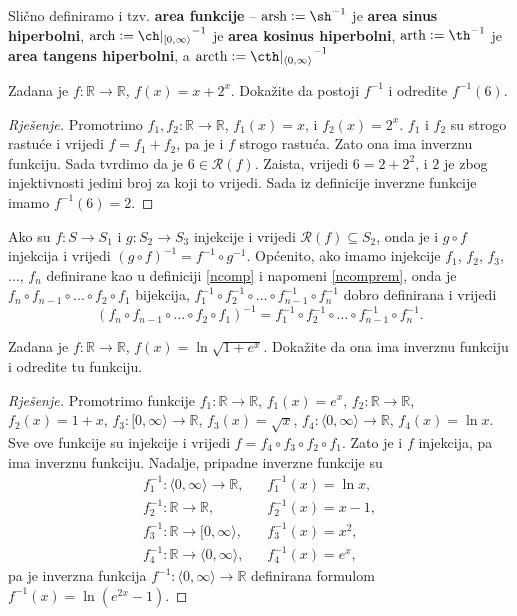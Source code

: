 Slično definiramo i tzv. \textbf{area funkcije} -- $\mathrm{arsh}:=\sh^{-1}$ je \textbf{area sinus hiperbolni}, $\mathrm{arch}:={\ch|_{[0, \infty\rangle}}^{-1}$ je \textbf{area kosinus hiperbolni}, $\mathrm{arth}:=\th^{-1}$ je \textbf{area tangens hiperbolni}, a $\mathrm{arcth}:={\cth|_{\langle 0, \infty\rangle}}^{-1}$
\newpage
\begin{exercise}
Zadana je $f : \mathbb{R}\to \mathbb{R}$, $f(x)=x+2^x$. Dokažite da postoji $f^{-1}$ i odredite $f^{-1}(6)$.
\end{exercise}
\begin{proof}[Rješenje]
Promotrimo $f_1, f_2 : \mathbb{R}\to \mathbb{R}$, $f_1(x)=x$, i $f_2(x)=2^x$. $f_1$ i $f_2$ su strogo rastuće i vrijedi $f=f_1+f_2$, pa je i $f$ strogo rastuća. Zato ona ima inverznu funkciju. Sada tvrdimo da je $6\in \mathcal{R}(f)$. Zaista, vrijedi $6=2+2^2$, i $2$ je zbog injektivnosti jedini broj za koji to vrijedi. Sada iz definicije inverzne funkcije imamo $f^{-1}(6)=2$.
\end{proof}
\begin{remark}
Ako su $f : S\to S_1$ i $g : S_2 \to S_3$ injekcije i vrijedi $\mathcal{R}(f)\subseteq S_2$, onda je i $g\circ f$ injekcija i vrijedi $(g\circ f)^{-1}=f^{-1}\circ g^{-1}$. Općenito, ako imamo injekcije $f_1$, $f_2$, $f_3$, $\dots$, $f_n$ definirane kao u definiciji \ref{ncomp} i napomeni \ref{ncomprem}, onda je $f_n\circ f_{n-1}\circ\dots\circ f_2\circ f_1$ bijekcija, $f_1^{-1}\circ f_2^{-1}\circ \dots \circ f_{n-1}^{-1}\circ f_n^{-1}$ dobro definirana i vrijedi
$$(f_n\circ f_{n-1}\circ\dots\circ f_2\circ f_1)^{-1}=f_1^{-1}\circ f_2^{-1}\circ \dots \circ f_{n-1}^{-1}\circ f_n^{-1}.$$
\end{remark}
\begin{exercise}
Zadana je $f : \mathbb{R}\to \mathbb{R}$, $f(x)=\ln{\sqrt{1+e^x}}$. Dokažite da ona ima inverznu funkciju i odredite tu funkciju.
\end{exercise}
\begin{proof}[Rješenje]
Promotrimo funkcije $f_1: \mathbb{R}\to \mathbb{R}$, $f_1(x)=e^x$, $f_2 : \mathbb{R}\to \mathbb{R}$, $f_2(x)=1+x$, $f_3 : [ 0,\infty\rangle\to \mathbb{R}$, $f_3(x)=\sqrt{x}$, $f_4 : \langle 0,\infty\rangle\to \mathbb{R}$, $f_4(x)=\ln{x}$. Sve ove funkcije su injekcije i vrijedi $f=f_4\circ f_3\circ f_2\circ f_1$. Zato je i $f$ injekcija, pa ima inverznu funkciju. Nadalje, pripadne inverzne funkcije su
\begin{align*}
f_1^{-1} : \langle 0, \infty\rangle\to \mathbb{R},&\;\;\; f_1^{-1}(x)=\ln{x},\\
f_2^{-1} : \mathbb{R}\to \mathbb{R},&\;\;\; f_2^{-1}(x)=x-1,\\
f_3^{-1} : \mathbb{R}\to [0, \infty\rangle,&\;\;\; f_3^{-1}(x)=x^2,\\
f_4^{-1} : \mathbb{R}\to \langle 0, \infty\rangle,&\;\;\; f_4^{-1}(x)=e^x,
\end{align*}
pa je inverzna funkcija $f^{-1} : \langle 0,\infty\rangle\to \mathbb{R}$ definirana formulom $f^{-1}(x)=\ln(e^{2x}-1)$.
\end{proof}
